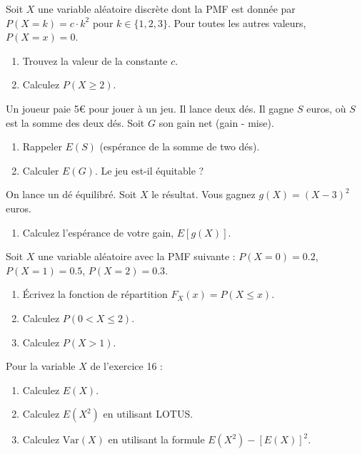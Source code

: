 
\begin{exercicebox}
Soit $X$ une variable aléatoire discrète dont la PMF est donnée par $P(X=k) = c \cdot k^2$ pour $k \in \{1, 2, 3\}$. Pour toutes les autres valeurs, $P(X=x)=0$.
\begin{enumerate}
    \item Trouvez la valeur de la constante $c$.
    \item Calculez $P(X \ge 2)$.
\end{enumerate}
\end{exercicebox}

\begin{exercicebox}
Un joueur paie 5€ pour jouer à un jeu. Il lance deux dés. Il gagne $S$ euros, où $S$ est la somme des deux dés. Soit $G$ son gain net (gain - mise).
\begin{enumerate}
    \item Rappeler $E(S)$ (espérance de la somme de two dés).
    \item Calculer $E(G)$. Le jeu est-il équitable ?
\end{enumerate}
\end{exercicebox}

\begin{exercicebox}
On lance un dé équilibré. Soit $X$ le résultat. Vous gagnez $g(X) = (X-3)^2$ euros.
\begin{enumerate}
    \item Calculez l'espérance de votre gain, $E[g(X)]$.
\end{enumerate}
\end{exercicebox}

\begin{exercicebox}
Soit $X$ une variable aléatoire avec la PMF suivante :
$P(X=0) = 0.2$, $P(X=1) = 0.5$, $P(X=2) = 0.3$.
\begin{enumerate}
    \item Écrivez la fonction de répartition $F_X(x) = P(X \le x)$.
    \item Calculez $P(0 < X \le 2)$.
    \item Calculez $P(X > 1)$.
\end{enumerate}
\end{exercicebox}

\begin{exercicebox}
Pour la variable $X$ de l'exercice 16 :
\begin{enumerate}
    \item Calculez $E(X)$.
    \item Calculez $E(X^2)$ en utilisant LOTUS.
    \item Calculez $\text{Var}(X)$ en utilisant la formule $E(X^2) - [E(X)]^2$.
\end{enumerate}
\end{exercicebox}

